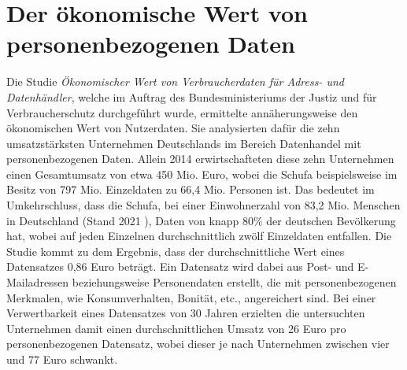 \section{Der ökonomische Wert von personenbezogenen Daten}

Die Studie \textit{Ökonomischer Wert von Verbraucherdaten für Adress- und Datenhändler}, welche im Auftrag des Bundesministeriums der Justiz und für Verbraucherschutz durchgeführt wurde, ermittelte annäherungsweise den ökonomischen Wert von Nutzerdaten. Sie analysierten dafür die zehn umsatzstärksten Unternehmen Deutschlands im Bereich Datenhandel mit personenbezogenen Daten. Allein 2014 erwirtschafteten diese zehn Unternehmen einen Gesamtumsatz von etwa 450 Mio. Euro, wobei die Schufa beispielsweise im Besitz von 797 Mio. Einzeldaten zu 66,4 Mio. Personen ist. Das bedeutet im Umkehrschluss, dass die Schufa, bei einer Einwohnerzahl von 83,2 Mio. Menschen in Deutschland (Stand 2021 \cite{einwohnerzahl_2021}), Daten von knapp 80\% der deutschen Bevölkerung hat, wobei auf jeden Einzelnen durchschnittlich zwölf Einzeldaten entfallen. Die Studie kommt zu dem Ergebnis, dass der durchschnittliche Wert eines Datensatzes 0,86 Euro beträgt. Ein Datensatz wird dabei aus Post- und E-Mailadressen beziehungsweise Personendaten erstellt, die mit personenbezogenen Merkmalen, wie Konsumverhalten, Bonität, etc., angereichert sind. Bei einer Verwertbarkeit eines Datensatzes von 30 Jahren erzielten die untersuchten Unternehmen damit einen durchschnittlichen Umsatz von 26 Euro pro personenbezogenen Datensatz, wobei dieser je nach Unternehmen zwischen vier und 77 Euro schwankt. \cite{Wert_der_Daten_2017}